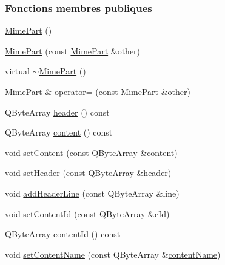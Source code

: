 \subsubsection*{Fonctions membres publiques}
\begin{DoxyCompactItemize}
\item 
\hyperlink{class_simple_mail_1_1_mime_part_a32106b6567131dd5f4e8d26359a85249}{Mime\+Part} ()
\item 
\hyperlink{class_simple_mail_1_1_mime_part_a22b25ea7c1bb06d1b73f4c43103bfa1e}{Mime\+Part} (const \hyperlink{class_simple_mail_1_1_mime_part}{Mime\+Part} \&other)
\item 
virtual \hyperlink{class_simple_mail_1_1_mime_part_adfd3bd58465ffea728a0e057039d42bb}{$\sim$\+Mime\+Part} ()
\item 
\hyperlink{class_simple_mail_1_1_mime_part}{Mime\+Part} \& \hyperlink{class_simple_mail_1_1_mime_part_a34320574f8cba9dbe03cca99e3fca942}{operator=} (const \hyperlink{class_simple_mail_1_1_mime_part}{Mime\+Part} \&other)
\item 
Q\+Byte\+Array \hyperlink{class_simple_mail_1_1_mime_part_a87f3646cf7e63664d3d92d087afd76ae}{header} () const
\item 
Q\+Byte\+Array \hyperlink{class_simple_mail_1_1_mime_part_a22fd1bc02bce6c9655d879fd71620bf5}{content} () const
\item 
void \hyperlink{class_simple_mail_1_1_mime_part_a16791412c7235c04bf16a57120a45b84}{set\+Content} (const Q\+Byte\+Array \&\hyperlink{class_simple_mail_1_1_mime_part_a22fd1bc02bce6c9655d879fd71620bf5}{content})
\item 
void \hyperlink{class_simple_mail_1_1_mime_part_ad008e68412ccd0cd4b5b69b29ce77efb}{set\+Header} (const Q\+Byte\+Array \&\hyperlink{class_simple_mail_1_1_mime_part_a87f3646cf7e63664d3d92d087afd76ae}{header})
\item 
void \hyperlink{class_simple_mail_1_1_mime_part_a5736ee4f652fe80f90c5ff4e61a316cc}{add\+Header\+Line} (const Q\+Byte\+Array \&line)
\item 
void \hyperlink{class_simple_mail_1_1_mime_part_a710551ded129f4a9c7ea0f74d8d90bb9}{set\+Content\+Id} (const Q\+Byte\+Array \&c\+Id)
\item 
Q\+Byte\+Array \hyperlink{class_simple_mail_1_1_mime_part_a95fbca14bef123a2b65227f4d26622a5}{content\+Id} () const
\item 
void \hyperlink{class_simple_mail_1_1_mime_part_a83f6e6e295967d11923b64ed0bda437f}{set\+Content\+Name} (const Q\+Byte\+Array \&\hyperlink{class_simple_mail_1_1_mime_part_ad16adf3afc9873b4b0636cd3264e2f3e}{content\+Name})

\end{DoxyCompactItemize}
